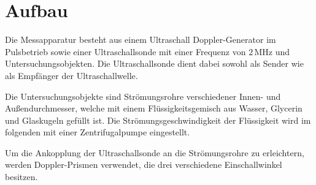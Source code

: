 \section{Aufbau}
\label{sec:Aufbau}

Die Messapparatur besteht aus einem Ultraschall Doppler-Generator im Pulsbetrieb sowie einer Ultraschallsonde mit einer Frequenz von $2\,\unit{\mega\hertz}$
und Untersuchungsobjekten. Die Ultraschallsonde dient dabei sowohl als Sender wie als Empfänger der Ultraschallwelle. 

Die Untersuchungsobjekte sind Strömungsrohre verschiedener Innen- und Außendurchmesser, welche mit einem Flüssigkeitsgemisch aus Wasser, Glycerin und 
Glaskugeln gefüllt ist. Die Strömungsgeschwindigkeit der Flüssigkeit wird im folgenden mit einer Zentrifugalpumpe eingestellt.

Um die Ankopplung der Ultraschallsonde an die Strömungsrohre zu erleichtern, werden Doppler-Prismen verwendet, die drei verschiedene Einschallwinkel besitzen.
